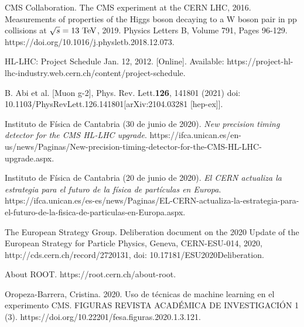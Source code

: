 \documentclass[11pt]{articulo}
\begin{document}
\begin{thebibliography}{X}
	
 CMS Collaboration. The CMS experiment at the CERN LHC, 2016. Measurements of properties of the Higgs boson decaying to a W boson pair in pp collisions at $\sqrt{s} = 13~{\rm TeV}$, 2019. Physics Letters B, Volume 791, Pages 96-129. https://doi.org/10.1016/j.physletb.2018.12.073.
	
 HL-LHC: Project Schedule Jan. 12, 2012. [Online]. Available: https://project-hl-lhc-industry.web.cern.ch/content/project-schedule.

 B. Abi et al. [Muon g-2], Phys. Rev. Lett.\textbf{126}, 141801 (2021) doi: 10.1103/PhysRevLett.126.141801[arXiv:2104.03281 [hep-ex]].
  
 Instituto de F\'isica de Cantabria (30 de junio de 2020). \textit{New precision timing detector for the CMS HL-LHC upgrade}. https://ifca.unican.es/en-us/news/Paginas/New-precision-timing-detector-for-the-CMS-HL-LHC-upgrade.aspx.

 Instituto de F\'isica de Cantabria (20 de junio de 2020). \textit{El CERN actualiza la estrategia para el futuro de la f\'isica de part\'iculas en Europa}. https://ifca.unican.es/es-es/news/Paginas/EL-CERN-actualiza-la-estrategia-para-el-futuro-de-la-fisica-de-particulas-en-Europa.aspx.
  
 The European Strategy Group. Deliberation document on the 2020 Update of the European Strategy for Particle Physics, Geneva, CERN-ESU-014, 2020, http://cds.cern.ch/record/2720131, doi: 10.17181/ESU2020Deliberation.
    
About ROOT. https://root.cern.ch/about-root.
  
 Oropeza-Barrera, Cristina. 2020. Uso de t\'ecnicas de machine learning en el experimento CMS. FIGURAS REVISTA ACAD\'EMICA DE INVESTIGACI\'ON 1 (3). https://doi.org/10.22201/fesa.figuras.2020.1.3.121.
	
\end{thebibliography}
\end{document}
